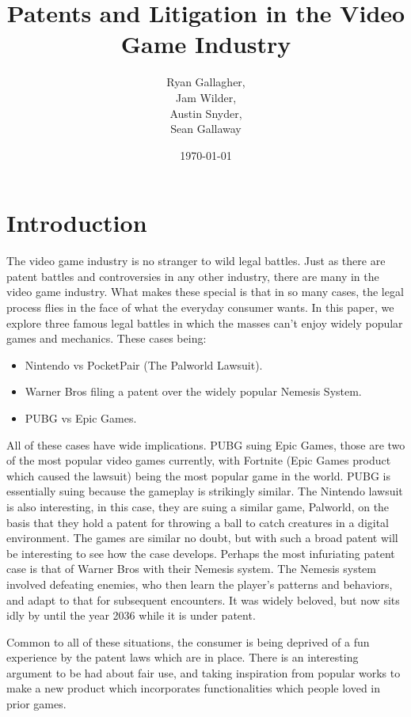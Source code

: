 \documentclass{article}
\title{Patents and Litigation in the Video Game Industry}
\author{Ryan Gallagher,
\\ Jam Wilder,
\\ Austin Snyder,
\\ Sean Gallaway}
\date{\today}
\begin{document}
\maketitle

\section{Introduction}
The video game industry is no stranger to wild legal battles. Just as there are patent battles and controversies in any other industry, there are many in the video game industry. What makes these special is that in so many cases, the legal process flies in the face of what the everyday consumer wants. In this paper, we explore three famous legal battles in which the masses can't enjoy widely popular games and mechanics. These cases being:
\begin{itemize}
    \item Nintendo vs PocketPair (The Palworld Lawsuit).
    \item Warner Bros filing a patent over the widely popular Nemesis System.
    \item PUBG vs Epic Games.
\end{itemize}
\par All of these cases have wide implications. PUBG suing Epic Games, those are two of the most popular video games currently, with Fortnite (Epic Games product which caused the lawsuit) being the most popular game in the world. PUBG is essentially suing because the gameplay is strikingly similar. The Nintendo lawsuit is also interesting, in this case, they are suing a similar game, Palworld, on the basis that they hold a patent for throwing a ball to catch creatures in a digital environment. The games are similar no doubt, but with such a broad patent will be interesting to see how the case develops. Perhaps the most infuriating patent case is that of Warner Bros with their Nemesis system. The Nemesis system involved defeating enemies, who then learn the player's patterns and behaviors, and adapt to that for subsequent encounters. It was widely beloved, but now sits idly by until the year 2036 while it is under patent.
\par Common to all of these situations, the consumer is being deprived of a fun experience by the patent laws which are in place. There is an interesting argument to be had about fair use, and taking inspiration from popular works to make a new product which incorporates functionalities which people loved in prior games.
\end{document}
